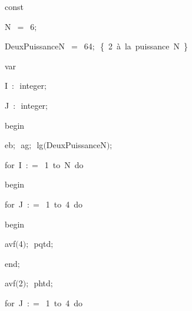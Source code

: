 {\pagebreak[3] 
\vspace{\neglskip}\mbox{\blc  \blk\idt  \mcl const\idt }\par 
\vspace{\neglskip}\mbox{\blc  \blk\blk\idt  N\ $=$\ 6$;$}\par 
\vspace{\neglskip}\mbox{\blc  \blk\blk\idt  DeuxPuissanceN\ $=$\ 64$;$\ \cmt  \{\ 2\ à\ la\ puissance\ N\ \}\idt }\par 
\pagebreak[3] 
\vspace{\neglskip}\mbox{\blc  \blk\idt  \mcl var\idt \ }\par 
\vspace{\neglskip}\mbox{\blc  \blk\blk\idt  I\ $:$\ integer$;$}\par 
\vspace{\neglskip}\mbox{\blc  \blk\blk\idt  J\ $:$\ integer$;$}\par 
\vspace{\neglskip}\mbox{\blc  \idt  \mcl begin\idt }\par 
\vspace{\neglskip}\mbox{\blc  \blk\idt  eb$;$\ ag$;$\ lg$($DeuxPuissanceN$)$$;$}\par 
\pagebreak[3] 
\vspace{\neglskip}\mbox{\blc  \blk\idt  \mcl for\idt \ I\ $:$$=$\ 1\ \mcl to\idt \ N\ \mcl do\idt }\par 
\vspace{\neglskip}\mbox{\blc  \blk\blk\idt  \mcl begin\idt }\par 
\pagebreak[3] 
\vspace{\neglskip}\mbox{\blc  \blk\blk\blk\idt  \mcl for\idt \ J\ $:$$=$\ 1\ \mcl to\idt \ 4\ \mcl do\idt }\par 
\vspace{\neglskip}\mbox{\blc  \blk\blk\blk\blk\idt  \mcl begin\idt }\par 
\vspace{\neglskip}\mbox{\blc  \blk\blk\blk\blk\blk\idt  avf$($4$)$$;$\ pqtd$;$\ }\par 
\vspace{\neglskip}\mbox{\blc  \blk\blk\blk\blk\idt  \mcl end\idt $;$}\par 
\vspace{\neglskip}\mbox{\blc  \blk\blk\blk\idt  avf$($2$)$$;$\ phtd$;$\ }\par 
\pagebreak[3] 
\vspace{\neglskip}\mbox{\blc  \blk\blk\blk\idt  \mcl for\idt \ J\ $:$$=$\ 1\ \mcl to\idt \ 4\ \mcl do\idt }\par 
}
